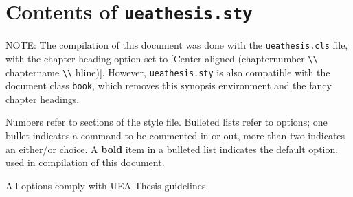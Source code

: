 \chapter{Contents of \texttt{ueathesis.sty}}

\begin{synopsis}
\noindent NOTE: The compilation of this document was done with the \verb|ueathesis.cls| file, with the chapter heading option set to [Center aligned (chapternumber \verb|\\| chaptername \verb|\\| hline)]. However, \verb|ueathesis.sty| is also compatible with the document class \verb|book|, which removes this synopsis environment and the fancy chapter headings.
\end{synopsis}

Numbers refer to sections of the style file. Bulleted lists refer to options; one bullet indicates a command to be commented in or out, more than two indicates an either/or choice. A \textbf{bold} item in a bulleted list indicates the default option, used in compilation of this document.

All options comply with UEA Thesis guidelines.

